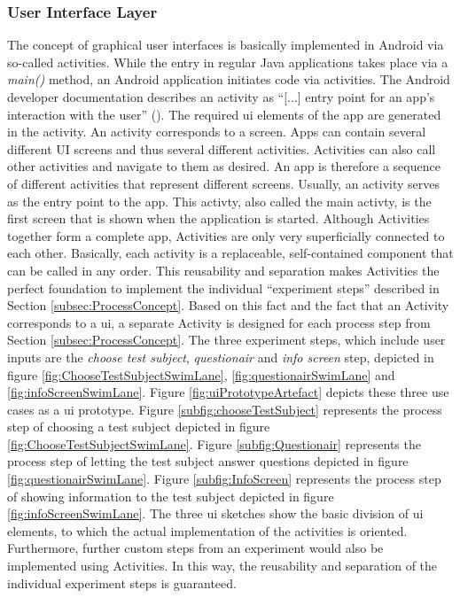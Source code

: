 \subsubsection{User Interface Layer}

The concept of graphical user interfaces is basically implemented in Android via so-called activities. While the entry in regular Java applications takes place via a \textit{main()} method, an Android application initiates code via activities. The Android developer documentation describes an activity as \enquote{[...] entry point for an app's interaction with the user} (\cite{Google.2023}). The required \ac{ui} elements of the app are generated in the activity. An activity corresponds to a screen. Apps can contain several different UI screens and thus several different activities. Activities can also call other activities and navigate to them as desired. An app is therefore a sequence of different activities that represent different screens. Usually, an activity serves as the entry point to the app. This activty, also called the main activty, is the first screen that is shown when the application is started. Although Activities together form a complete app, Activities are only very superficially connected to each other. Basically, each activity is a replaceable, self-contained component that can be called in any order. This reusability and separation makes Activities the perfect foundation to implement the individual \enquote{experiment steps} described in Section \ref{subsec:ProcessConcept}. Based on this fact and the fact that an Activity corresponds to a \ac{ui}, a separate Activity is designed for each process step from Section \ref{subsec:ProcessConcept}. The three experiment steps, which include user inputs are the \textit{choose test subject}, \textit{questionair} and \textit{info screen} step, depicted in figure \ref{fig:ChooseTestSubjectSwimLane}, \ref{fig:questionairSwimLane} and \ref{fig:infoScreenSwimLane}. Figure \ref{fig:uiPrototypeArtefact} depicts these three use cases as a \ac{ui} prototype. Figure \ref{subfig:chooseTestSubject} represents the process step of choosing a test subject depicted in figure \ref{fig:ChooseTestSubjectSwimLane}. Figure \ref{subfig:Questionair} represents the process step of letting the test subject answer questions depicted in figure \ref{fig:questionairSwimLane}. Figure \ref{subfig:InfoScreen}  represents the process step of showing information to the test subject depicted in figure \ref{fig:infoScreenSwimLane}. The three \ac{ui} sketches show the basic division of \ac{ui} elements, to which the actual implementation of the activities is oriented. Furthermore, further custom steps from an experiment would also be implemented using Activities. In this way, the reusability and separation of the individual experiment steps is guaranteed.


